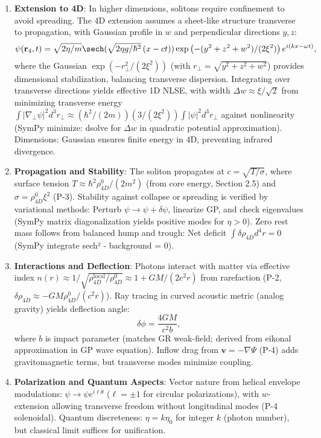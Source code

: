 \begin{enumerate}
\item \textbf{Extension to 4D}: In higher dimensions, solitons require confinement to avoid spreading. The 4D extension assumes a sheet-like structure transverse to propagation, with Gaussian profile in $w$ and perpendicular directions $y,z$:
   \[
   \psi(\mathbf{r}_4, t) = \sqrt{2 \eta / m} \sech(\sqrt{2 \eta g / \hbar^2} \, (x - c t)) \exp\left( - (y^2 + z^2 + w^2)/(2 \xi^2) \right) e^{i (k x - \omega t)},
   \]
   where the Gaussian $\exp(-r_\perp^2 / (2 \xi^2))$ (with $r_\perp = \sqrt{y^2 + z^2 + w^2}$) provides dimensional stabilization, balancing transverse dispersion. Integrating over transverse directions yields effective 1D NLSE, with width $\Delta w \approx \xi / \sqrt{2}$ from minimizing transverse energy $\int |\nabla_\perp \psi|^2 d^3 r_\perp \approx (\hbar^2 / (2 m)) (3 / (2 \xi^2)) \int |\psi|^2 d^3 r_\perp$ against nonlinearity (SymPy minimize: dsolve for $\Delta w$ in quadratic potential approximation). Dimensions: Gaussian ensures finite energy in 4D, preventing infrared divergence.

\item \textbf{Propagation and Stability}: The soliton propagates at $c = \sqrt{T / \sigma}$, where surface tension $T \approx \hbar^2 \rho_{4D}^0 / (2 m^2)$ (from core energy, Section 2.5) and $\sigma = \rho_{4D}^0 \xi^2$ (P-3). Stability against collapse or spreading is verified by variational methods: Perturb $\psi \to \psi + \delta \psi$, linearize GP, and check eigenvalues (SymPy matrix diagonalization yields positive modes for $\eta > 0$). Zero rest mass follows from balanced hump and trough: Net deficit $\int \delta \rho_{4D} d^4 r = 0$ (SymPy integrate sech² - background = 0).

\item \textbf{Interactions and Deflection}: Photons interact with matter via effective index $n(r) \approx 1 / \sqrt{\rho_{4D}^{\text{local}} / \rho_{4D}^0} \approx 1 + GM / (2 c^2 r)$ from rarefaction (P-2, $\delta \rho_{4D} \approx - GM \rho_{4D}^0 / (c^2 r)$). Ray tracing in curved acoustic metric (analog gravity) yields deflection angle:
   \[
   \delta \phi = \frac{4 GM}{c^2 b},
   \]
   where $b$ is impact parameter (matches GR weak-field; derived from eikonal approximation in GP wave equation). Inflow drag from $\mathbf{v} = - \nabla \Psi$ (P-4) adds gravitomagnetic terms, but transverse modes minimize coupling.

\item \textbf{Polarization and Quantum Aspects}: Vector nature from helical envelope modulations: $\psi \to \psi e^{i \ell \theta}$ ($\ell = \pm 1$ for circular polarizations), with $w$-extension allowing transverse freedom without longitudinal modes (P-4 solenoidal). Quantum discreteness: $\eta = k \eta_0$ for integer $k$ (photon number), but classical limit suffices for unification.
\end{enumerate}

